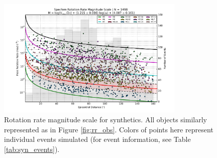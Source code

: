 \documentclass{gji}
\begin{document}
\begin{figure}
\centerline{\includegraphics[width=0.8\textwidth]{rr_syn}}
\caption{Rotation rate magnitude scale for synthetics. All objects similarly represented as in Figure \ref{fig:rr_obs}. Colors of points here represent individual events simulated (for event information, see Table \ref{tab:syn_events}).}
\label{fig:syn_scale}
\end{figure}
\end{document}
